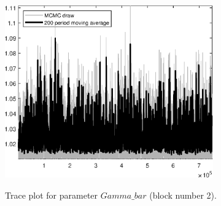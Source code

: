 \begin{figure}[H]
\centering
  \includegraphics[width=0.8\textwidth]{directed_search_est/graphs/TracePlot_Gamma_bar_blck_2}\\
    \caption{Trace plot for parameter $Gamma\_bar$ (block number 2).}
\end{figure}
